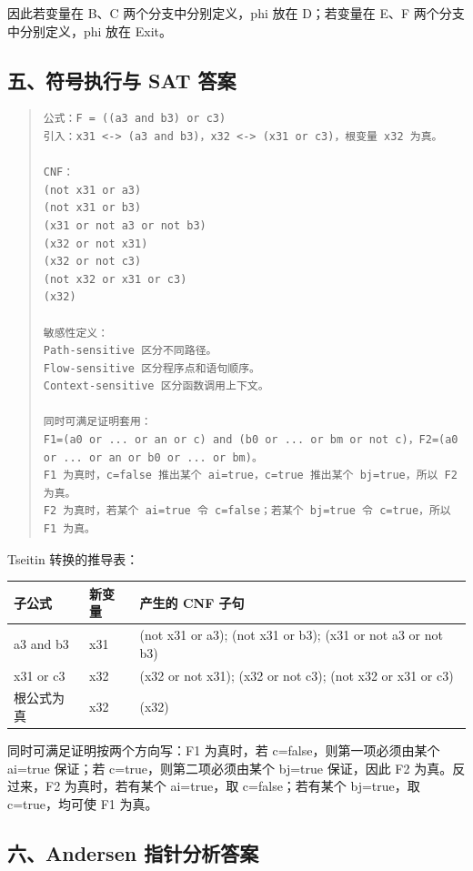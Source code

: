 \documentclass[UTF8,zihao=-4]{ctexart}
\begin{document}
因此若变量在 B、C 两个分支中分别定义，phi 放在 D；若变量在 E、F 两个分支中分别定义，phi 放在 Exit。



\subsection{五、符号执行与 SAT 答案}


\begin{quote}
\footnotesize
\begin{verbatim}
公式：F = ((a3 and b3) or c3)
引入：x31 <-> (a3 and b3)，x32 <-> (x31 or c3)，根变量 x32 为真。

CNF：
(not x31 or a3)
(not x31 or b3)
(x31 or not a3 or not b3)
(x32 or not x31)
(x32 or not c3)
(not x32 or x31 or c3)
(x32)

敏感性定义：
Path-sensitive 区分不同路径。
Flow-sensitive 区分程序点和语句顺序。
Context-sensitive 区分函数调用上下文。

同时可满足证明套用：
F1=(a0 or ... or an or c) and (b0 or ... or bm or not c)，F2=(a0 or ... or an or b0 or ... or bm)。
F1 为真时，c=false 推出某个 ai=true，c=true 推出某个 bj=true，所以 F2 为真。
F2 为真时，若某个 ai=true 令 c=false；若某个 bj=true 令 c=true，所以 F1 为真。
\end{verbatim}
\end{quote}

Tseitin 转换的推导表：

\begin{center}
\footnotesize
\begin{tabular}{lll}
\hline
子公式 & 新变量 & 产生的 CNF 子句 \\
\hline
a3 and b3 & x31 & (not x31 or a3); (not x31 or b3); (x31 or not a3 or not b3) \\
x31 or c3 & x32 & (x32 or not x31); (x32 or not c3); (not x32 or x31 or c3) \\
根公式为真 & x32 & (x32) \\
\hline
\end{tabular}
\end{center}

同时可满足证明按两个方向写：F1 为真时，若 c=false，则第一项必须由某个 ai=true 保证；若 c=true，则第二项必须由某个 bj=true 保证，因此 F2 为真。反过来，F2 为真时，若有某个 ai=true，取 c=false；若有某个 bj=true，取 c=true，均可使 F1 为真。



\subsection{六、Andersen 指针分析答案}
\end{document}
